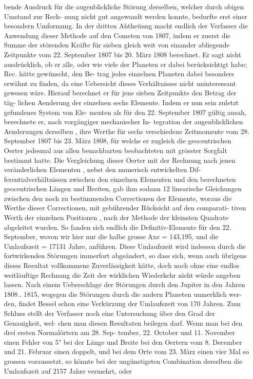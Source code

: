 \documentclass[12pt,a4paper]{article}
\begin{document}
bende  Ausdruck  für  die  augenblickliche  Störung  derselben,  welcher  durch  obigen  Umstand  zur  Rech- nung nicht  gut  angewandt  werden  konnte,  bedurfte  erst  einer  besondern  Umformung. In  der  dritten  Ahtheüung  macht  endlich  der  Verfasser  die  Anwendung  dieser  Methode  auf  den Cometen  von  1807,  indem  er  zuerst  die  Summe  der  störenden  Kräfte  für  sieben  gleich  weit  von  einander abliegende  Zeitpunkte  vom  22.  September  1807  bis  20.  März  1808  berechnet.  Er  sagt  nicht  ausdrücklich, ob  er  alle,  oder  wie  viele  der  Planeten  er  dabei  berücksichtigt  habe;  Rec.  hätte  gewünscht,  den  Be- trag jedes  einzelnen  Planeten  dabei  besonders  erwähnt  zu  finden,  da  eine  Uebersicht  dieses  Verhältnisses nicht  uninteressant  gewesen  wäre.  Hierauf  berechnet  er  für  jene  sieben  Zeitpunkte  den  Betrag  der  täg- lichen Aenderung  der  einzelnen  sechs  Elemente.  Indem  er  nun  sein  zuletzt  gefundenes  System  von  Ele- menten als  für  den  22.  September  1807  gültig  ansah,  berechnete  er,  nach  vorgängiger  mechanischer  In- tegration der  augenblicklichen  Aenderuugen  derselben ,  ihre  Werthe  für  sechs  verschiedene  Zeitmomente vom  28.  September  1807  bis  23.  März  1808,  für  welche  er  zugleich  die  geocentrischen  Oerter  jedesmal aus  allen  benachbarten  beobachteten  mit  grösster  Sorgfalt  bestimmt  hatte.  Die  Vergleichung  dieser Oerter  mit  der  Rechnung  nach  jenen  veränderlichen  Elementen ,  nebst  den  numerisch  entwickelten  Dif- ferentialverhältnissen zwischen  den  einzelnen  Elementen  und  den  berechneten  geocentrischen  Längen  und Breiten,  gab  ihm  sodann  12  linearische  Gleichungen  zwischen  den  noch  zu  bestimmenden  Correctionen der  Elemente,  woraus  die  Werthe  dieser  Correctionen,  mit  gebührender  Rücksicht  auf  den  comparati- tiven  Werth  der  einzelnen  Positionen ,  nach  der  Methode  der  kleinsten  Quadrate  abgeleitet  wurden.  So fanden  sich  endlich  die  Definitiv-Elemente  für  den  22.  September,  wovon  wir  hier  nur  die  halbe  grosse Axe  =  143,195,  und  die  Umlaufszeit  =  17131  Jahre,  anführen.  Diese  Umlaufszeit  wird  indessen  durch die  fortwirkenden  Störungen  immerfort  abgeändert,  so  dass  sich,  wenn  auch  übrigens  dieses  Resultat vollkommene  Zuverlässigkeit  hätte,  doch  noch  ohne  eine  endlos  weitläuftige  Rechnung  die  Zeit  der wirklichen  Wiederkehr  nicht  würde  angeben  lassen.  Nach  einem  Ueberschlage  der  Störungen  durch  den Jupiter  in  den  Jahren  1808..  1815,  wogegen  die  Störungen  durch  die  andern  Planeten  unmerklich  wer- den, findet  Bessel  schon  eine  Verkürzung  der  Umlaufszeit  von  170  Jahren. Zum  Schluss  stellt  der  Verfasser  noch  eine  Untersuchung  über  den  Grad  der  Genauigkeit,  wel- chen man  diesen  Resultaten  beilegen  darf.  Wenn  man  bei  den  drei  ersten  Normalörtern  am  28.  Sep- tember,  22.  October  und  11.  November  einen  Fehler  von  5"  bei  der  Länge  und  Breite  bei  den  Oertern vom  8.  December  und  21.  Februar  einen  doppelt,  und  bei  dem  Orte  vom  23.  März  einen  vier  Mal  so grossen  voraussetzt,  so  könnte  bei  der  ungünstigsten  Combination  derselben  die  Umlaufszeit  auf  2157 Jahre  vermehrt,  oder  
\end{document}
